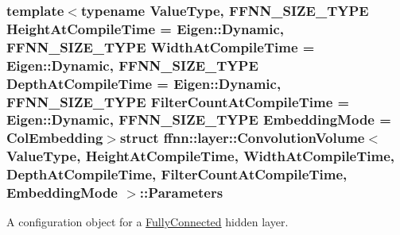 \subsubsection*{template$<$typename Value\-Type, F\-F\-N\-N\-\_\-\-S\-I\-Z\-E\-\_\-\-T\-Y\-P\-E Height\-At\-Compile\-Time = Eigen\-::\-Dynamic, F\-F\-N\-N\-\_\-\-S\-I\-Z\-E\-\_\-\-T\-Y\-P\-E Width\-At\-Compile\-Time = Eigen\-::\-Dynamic, F\-F\-N\-N\-\_\-\-S\-I\-Z\-E\-\_\-\-T\-Y\-P\-E Depth\-At\-Compile\-Time = Eigen\-::\-Dynamic, F\-F\-N\-N\-\_\-\-S\-I\-Z\-E\-\_\-\-T\-Y\-P\-E Filter\-Count\-At\-Compile\-Time = Eigen\-::\-Dynamic, F\-F\-N\-N\-\_\-\-S\-I\-Z\-E\-\_\-\-T\-Y\-P\-E Embedding\-Mode = Col\-Embedding$>$struct ffnn\-::layer\-::\-Convolution\-Volume$<$ Value\-Type, Height\-At\-Compile\-Time, Width\-At\-Compile\-Time, Depth\-At\-Compile\-Time, Filter\-Count\-At\-Compile\-Time, Embedding\-Mode $>$\-::\-Parameters}

A configuration object for a \hyperlink{classffnn_1_1layer_1_1_fully_connected}{Fully\-Connected} hidden layer. 


